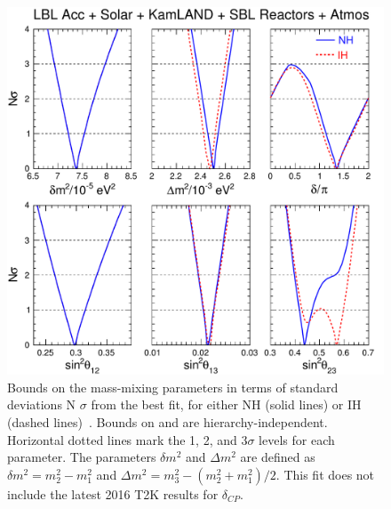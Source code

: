 \begin{figure}[htbp]
   	      \includegraphics[width=0.8\linewidth]{figures/Fig_01_lisi.pdf}
    \caption{Bounds on the mass-mixing parameters in terms of
standard deviations N $\sigma$ from the best fit, for either NH (solid lines) or IH (dashed lines)~\cite{Capozzi:2016rtj}. Bounds on \dmsqso and \thsol are
hierarchy-independent. Horizontal dotted lines mark the 1, 2, and 3$\sigma$ levels for each parameter. The parameters $\delta m^2$ and $\Delta m^2$ are defined as 
$\delta m^2 = m^2_2 - m^2_1$ and $\Delta m^2 = m^2_3 - (m^2_2 + m^2_1)/2$.
This fit does not include the latest 2016 T2K results for $\delta_{CP}$.
}
 \label{fig:globalfit}
\end{figure}


